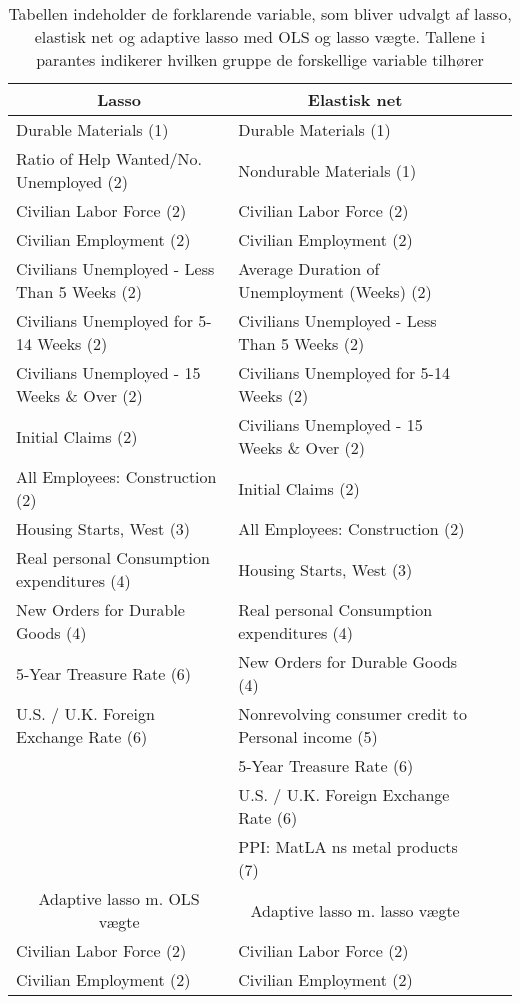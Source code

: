  \begin{table}
\small
\center
\begin{tabular}{lllc}
\toprule
\multicolumn{1}{c}{Lasso} & \multicolumn{1}{c}{Elastisk net} \\ \midrule
Durable Materials (1) &Durable Materials (1)   \\
Ratio of Help Wanted/No. Unemployed (2) & Nondurable Materials (1)  \\
Civilian Labor Force (2) &  Civilian Labor Force (2) \\
Civilian Employment (2)& Civilian Employment (2) \\
Civilians Unemployed - Less Than 5 Weeks (2) & Average Duration of Unemployment (Weeks) (2) \\
Civilians Unemployed for 5-14 Weeks (2) & Civilians Unemployed - Less Than 5 Weeks (2)  \\
Civilians Unemployed - 15 Weeks \& Over (2)& Civilians Unemployed for 5-14 Weeks (2) \\
Initial Claims (2)& Civilians Unemployed - 15 Weeks \& Over (2) \\
All Employees: Construction (2)& Initial Claims (2) \\
Housing Starts, West (3)&All Employees: Construction (2) \\
Real personal Consumption expenditures (4)& Housing Starts, West (3) \\
New Orders for Durable Goods (4) & Real personal Consumption expenditures (4) \\
5-Year Treasure Rate (6) & New Orders for Durable Goods (4) \\
U.S. / U.K. Foreign Exchange Rate (6)&Nonrevolving consumer credit to Personal income (5) \\
& 5-Year Treasure Rate (6)  \\
& U.S. / U.K. Foreign Exchange Rate (6) \\
& PPI: MatLA ns metal products (7) \\
\bottomrule 
\toprule
\multicolumn{1}{c}{Adaptive lasso m. OLS vægte} & \multicolumn{1}{c}{ Adaptive lasso m. lasso vægte}  \\ \midrule
Civilian Labor Force (2) & Civilian Labor Force (2) \\
Civilian Employment (2) & Civilian Employment (2) \\
 \bottomrule 
\end{tabular}
\caption{Tabellen indeholder de forklarende variable, som bliver udvalgt af lasso, elastisk net og adaptive lasso med OLS og lasso vægte. Tallene i parantes indikerer hvilken gruppe de forskellige variable tilhører} \label{tab:bic_ud}
\end{table}